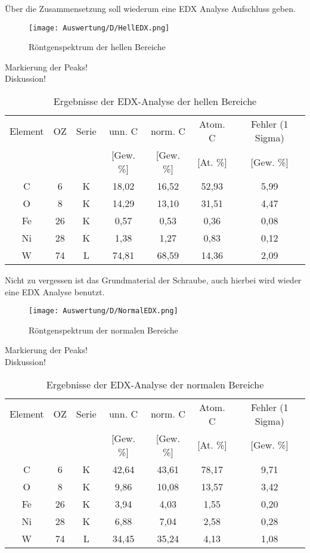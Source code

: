 \newpage
Über die Zusammensetzung soll wiederum eine EDX Analyse Aufschluss geben.
\begin{figure}[h]
    \centering
    \texttt{[image: Auswertung/D/HellEDX.png]}
    \caption{Röntgenspektrum der hellen Bereiche}
\end{figure}

Markierung der Peaks!\\
Diskussion!\\

\begin{table}[h]
    \centering
    \begin{tabular}{c|c|c|c|c|c|c}
        Element & OZ &Serie& unn. C & norm. C &  Atom. C  & Fehler (1 Sigma) \\
         & & & [Gew. \%] & [Gew. \%] & [At. \%] & [Gew. \%] \\
        \hline\hline
        C & 6 & K & 18,02 & 16,52 & 52,93 & 5,99\\
        O & 8 & K & 14,29 & 13,10 & 31,51 & 4,47\\
        Fe & 26 & K & 0,57 & 0,53 & 0,36 & 0,08\\
        Ni & 28 & K & 1,38 & 1,27 & 0,83 & 0,12\\
        W & 74 & L & 74,81 & 68,59 & 14,36 & 2,09
    \end{tabular}
    \caption{Ergebnisse der EDX-Analyse der hellen Bereiche}
\end{table}

\newpage
Nicht zu vergessen ist das Grundmaterial der Schraube, auch hierbei wird wieder eine EDX Analyse benutzt.
\begin{figure}[h]
    \centering
    \texttt{[image: Auswertung/D/NormalEDX.png]}
    \caption{Röntgenspektrum der normalen Bereiche}
\end{figure}

Markierung der Peaks!\\
Diskussion!\\

\begin{table}[h]
    \centering
    \begin{tabular}{c|c|c|c|c|c|c}
        Element & OZ &Serie& unn. C & norm. C &  Atom. C  & Fehler (1 Sigma) \\
         & & & [Gew. \%] & [Gew. \%] & [At. \%] & [Gew. \%] \\
        \hline\hline
        C & 6 & K & 42,64 & 43,61 & 78,17 & 9,71\\
        O & 8 & K & 9,86 & 10,08 & 13,57 & 3,42\\
        Fe & 26 & K & 3,94 & 4,03 & 1,55 & 0,20\\
        Ni & 28 & K & 6,88 & 7,04 & 2,58 & 0,28\\
        W & 74 & L & 34,45 & 35,24 & 4,13 & 1,08
    \end{tabular}
    \caption{Ergebnisse der EDX-Analyse der normalen Bereiche}
\end{table}

